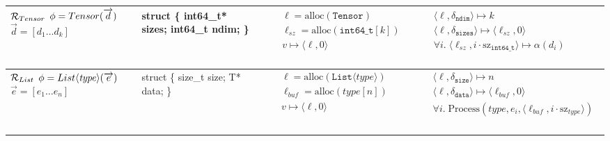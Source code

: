 \documentclass[manuscript,screen,review]{acmart}
\theoremstyle{indenteditalic}
\renewcommand\vec[1]{\overrightarrow{#1}}
\begin{document}
\begin{table}[htbp]
\begin{tabular}{m{}|m{}|>{\raggedright\arraybackslash}m{}|>{\raggedright\arraybackslash}m{}}
    $\mathcal{R}_{\textsc{Tensor}}$ \newline $\phi=\textsc{Tensor}(\vec{d})$ \newline $\vec{d}=[d_1 \dots d_k]$ &
    {\ttfamily struct \{ \newline \hspace*{0.8em} int64\_t* sizes; \newline \hspace*{0.8em} int64\_t ndim; \newline \}} &
\mbox{%
$\begin{aligned}
      & \ell = \text{alloc}(\texttt{Tensor}) \\
      & \ell_{sz} = \text{alloc}(\texttt{int64\_t}[k]) \\
      & v \mapsto \langle\ell, 0\rangle
    \end{aligned}$
}%
&
\mbox{%
$\begin{aligned}
      & \langle \ell, \delta_{\texttt{ndim}} \rangle \mapsto k \\
      & \langle \ell, \delta_{\texttt{sizes}} \rangle \mapsto \langle\ell_{sz}, 0\rangle \\
      & \forall i.\; \langle \ell_{sz}, i \cdot \text{sz}_{\texttt{int64\_t}} \rangle \mapsto \alpha(d_i)
    \end{aligned}$
}%
\\ \hline

    $\mathcal{R}_{\textsc{List}}$ \newline $\phi=\textsc{List}\langle\mathit{type}\rangle(\vec{e})$ \newline $\vec{e}=[e_1 \dots e_n]$ &
    {\ttfamily struct \{ \newline \hspace*{0.8em} size\_t size; \newline \hspace*{0.8em} T* data; \newline \}} &
\mbox{%
$\begin{aligned}
      & \ell = \text{alloc}(\texttt{List}\langle\mathit{type}\rangle) \\
      & \ell_{buf} = \text{alloc}(\mathit{type}[n]) \\
      & v \mapsto \langle\ell, 0\rangle
    \end{aligned}$
}%
&
\mbox{%
$\begin{aligned}
      & \langle \ell, \delta_{\texttt{size}} \rangle \mapsto n \\
      & \langle \ell, \delta_{\texttt{data}}\rangle \mapsto \langle\ell_{buf}, 0\rangle \\
      & \forall i. \; \text{Process}(\mathit{type}, e_i, \langle \ell_{buf}, i \cdot \text{sz}_{\mathit{type}} \rangle)
    \end{aligned}$
}%
\\ \hline


\end{tabular}
\end{table}
\end{document}
